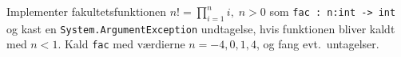 Implementer fakultetsfunktionen $n! = \prod_{i=1}^ni,\; n >0$ som \lstinline{fac : n:int -> int} og kast en \lstinline{System.ArgumentException} undtagelse, hvis funktionen bliver kaldt med $n < 1$. Kald \lstinline{fac} med værdierne $n=-4,0,1,4$, og fang evt.\ untagelser.